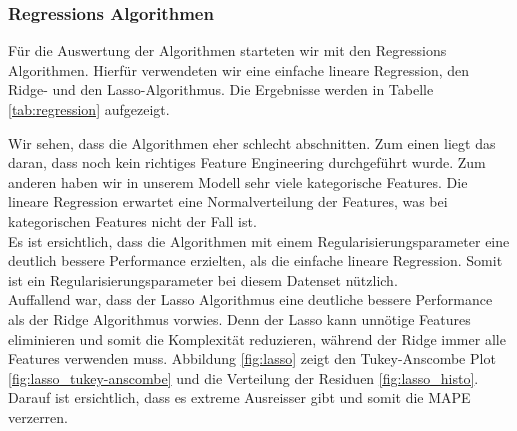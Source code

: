 \subsubsection{Regressions Algorithmen}
Für die Auswertung der Algorithmen starteten wir mit den Regressions Algorithmen. Hierfür verwendeten wir eine  einfache lineare Regression, den Ridge- und den Lasso-Algorithmus. Die Ergebnisse werden in Tabelle \ref{tab:regression} aufgezeigt.

\begin{table}[h]
\centering
{}
\caption{Ergebnisse der Regression Algorithmen}
\label{tab:regression}
\end{table}

Wir sehen, dass die Algorithmen eher schlecht abschnitten. Zum einen liegt das daran, dass noch kein richtiges Feature Engineering durchgeführt wurde. Zum anderen haben wir in unserem Modell sehr viele kategorische Features. Die lineare Regression erwartet eine Normalverteilung der Features, was bei kategorischen Features nicht der Fall ist.\\
Es ist ersichtlich, dass die Algorithmen mit einem Regularisierungsparameter eine deutlich bessere Performance erzielten, als die einfache lineare Regression. Somit ist ein Regularisierungsparameter bei diesem Datenset nützlich.\\
Auffallend war, dass der Lasso Algorithmus eine deutliche bessere Performance als der Ridge Algorithmus vorwies. Denn der Lasso kann unnötige Features eliminieren und somit die Komplexität reduzieren, während der Ridge immer alle Features verwenden muss. Abbildung \ref{fig:lasso} zeigt den Tukey-Anscombe Plot \ref{fig:lasso_tukey-anscombe} und die Verteilung der Residuen \ref{fig:lasso_histo}. Darauf ist ersichtlich, dass es extreme Ausreisser gibt und somit die MAPE verzerren.

